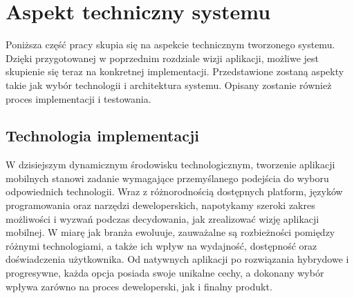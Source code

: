 \chapter{Aspekt techniczny systemu}
Poniższa część pracy skupia się na aspekcie technicznym tworzonego systemu.
Dzięki przygotowanej w poprzednim rozdziale wizji aplikacji, możliwe jest
skupienie się teraz na konkretnej implementacji. Przedstawione zostaną aspekty
takie jak wybór technologii i architektura systemu. Opisany zostanie również
proces implementacji i testowania.

\section{Technologia implementacji}
W dzisiejszym dynamicznym środowisku technologicznym, tworzenie aplikacji
mobilnych stanowi zadanie wymagające przemyślanego podejścia do wyboru
odpowiednich technologii. Wraz z różnorodnością dostępnych platform, języków
programowania oraz narzędzi deweloperskich, napotykamy szeroki zakres możliwości
i wyzwań podczas decydowania, jak zrealizować wizję aplikacji mobilnej. W miarę
jak branża ewoluuje, zauważalne są rozbieżności pomiędzy różnymi technologiami,
a także ich wpływ na wydajność, dostępność oraz doświadczenia użytkownika. Od
natywnych aplikacji po rozwiązania hybrydowe i progresywne, każda opcja posiada
swoje unikalne cechy, a dokonany wybór wpływa zarówno na proces deweloperski,
jak i finalny produkt.

